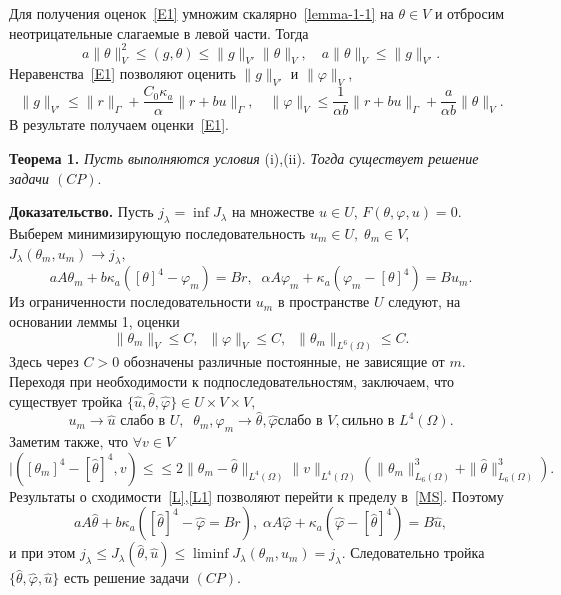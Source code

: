 \documentclass[12pt]{article}
\begin{document}
    Для получения оценок~\eqref{E1} умножим скалярно~\eqref{lemma-1-1} на $\theta \in V$ и отбросим неотрицательные
    слагаемые в левой части.
    Тогда
    \[
        a \|\theta\|^2_V \leq (g, \theta) \leq \|g\|_{V'}\|\theta\|_V,
        \quad a\|\theta\|_V \leq \|g\|_{V'}.
    \]
    Неравенства~\eqref{E1} позволяют оценить $\|g\|_{V'}$ и $\|\varphi\|_V $,
    \[
        \|g\|_{V'} \leq \|r\|_\Gamma + \frac{C_0\kappa_a}{\alpha}\|r + bu\|_\Gamma, \quad
        \|\varphi\|_V \leq \frac{1}{\alpha b} \|r + bu\|_\Gamma + \frac{a}{\alpha b} \|\theta\|_V.
    \]
    В результате получаем оценки~\eqref{E1}.

    \textbf{Теорема 1.}
    {\it
        Пусть выполняются условия} (i),(ii).
    {\it Тогда существует решение задачи $(CP).$
    }

    {\bf Доказательство.}
    Пусть $j_\lambda = \inf J_\lambda$ на множестве $u \in U$, $F(\theta, \varphi, u)=0.$
    Выберем минимизирующую последовательность
    $u_m \in U, \; \theta_m \in V$, $J_\lambda(\theta_m, u_m)
    \rightarrow j_\lambda,$
    \begin{equation}
        \label{MS}
        a A \theta_m +b \kappa_a([\theta]^4 - \varphi_m) = Br, \;\;
        \alpha A \varphi_m + \kappa_a (\varphi_m - [\theta]^4) = B u_m.
    \end{equation}
    Из ограниченности последовательности $u_m$ в пространстве $U$ следуют, на основании
    леммы 1, оценки
    \[
        \|\theta_m\|_V \leq C,\;\;
        \|\varphi\|_V \leq C,\;\;\|\theta_m\|_{L^6(\Omega)} \leq C.
    \]
    Здесь через $C>0$ обозначены различные постоянные, не зависящие от $m$.
    Переходя при необходимости к подпоследовательностям, заключаем, что
    существует тройка $\{ \hat{u}, \hat{\theta}, \hat{\varphi} \} \in U \times V \times V,$
    \begin{equation}
        \label{L}
        u_m \rightarrow \hat{u} \text{  слабо в } U, \;\;
        \theta_m, \varphi_m \rightarrow \hat{\theta}, \hat{\varphi} \text{
            слабо в } V, \text{
            сильно в } L^4(\Omega).
    \end{equation}
    Заметим также, что $\forall v \in V$
    \begin{equation}
        \label{L1}
        |( [\theta_m]^4 - [\hat{\theta}]^4, v) \leq
        \leq 2 \| \theta_m - \hat{\theta}\|_{L^4(\Omega)} \|v\|_{L^4(\Omega)}
        \left( \| \theta_m \|^3_{L_6(\Omega)} + \| \hat{\theta} \|^3_{L_6(\Omega)}\right).
    \end{equation}
    Результаты о сходимости~\eqref{L},\eqref{L1} позволяют перейти
    к пределу в~\eqref{MS}.
    Поэтому
    \[
        a A \hat{\theta} + b \kappa_a ([\hat{\theta}]^4 - \hat{\varphi} = Br), \;
        \alpha A \hat{\varphi} + \kappa_a (\hat{\varphi} -[\hat{\theta}]^4) = B \hat{u},
    \]
    и при этом $j_\lambda \leq J_\lambda(\hat{\theta}, \hat{u}) \leq \liminf J_\lambda(\theta_m, u_m) =
    j_\lambda$.
    Следовательно тройка $\{\hat{\theta}, \hat{\varphi}, \hat{u} \}$ есть
    решение задачи $(CP).$
\end{document}
